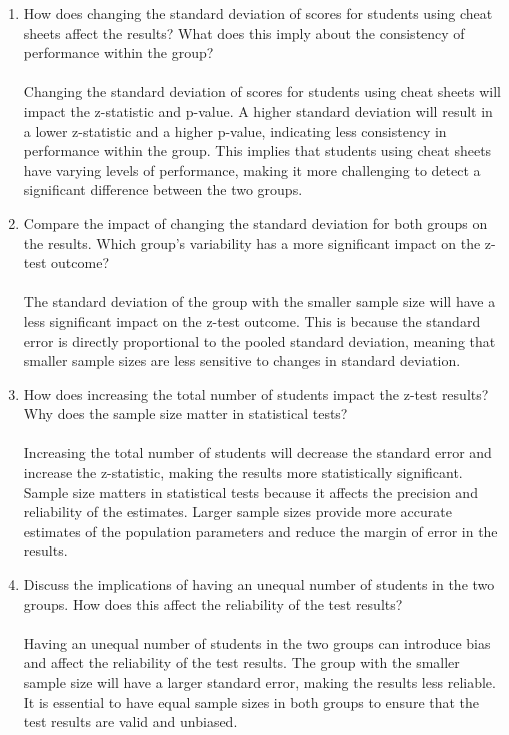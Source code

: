 \documentclass[a3paper,12pt]{extarticle} %
\begin{document}
\begin{enumerate}
\begin{enumerate}
        \item How does changing the standard deviation of scores for students using cheat sheets affect the
        results? What does this imply about the consistency of performance within the group?
        \\\\ Changing the standard deviation of scores for students using cheat sheets will impact the z-statistic and p-value. A higher standard deviation will result in a lower z-statistic and a higher p-value, indicating less consistency in performance within the group. This implies that students using cheat sheets have varying levels of performance, making it more challenging to detect a significant difference between the two groups.
        \item Compare the impact of changing the standard deviation for both groups on the results. Which
        group’s variability has a more significant impact on the z-test outcome?
        \\\\ The standard deviation of the group with the smaller sample size will have a less significant impact on the z-test outcome. This is because the standard error is directly proportional to the pooled standard deviation, meaning that smaller sample sizes are less sensitive to changes in standard deviation.
        \item How does increasing the total number of students impact the z-test results? Why does the
        sample size matter in statistical tests?
        \\\\ Increasing the total number of students will decrease the standard error and increase the z-statistic, making the results more statistically significant. Sample size matters in statistical tests because it affects the precision and reliability of the estimates. Larger sample sizes provide more accurate estimates of the population parameters and reduce the margin of error in the results.
        \item Discuss the implications of having an unequal number of students in the two groups. How
        does this affect the reliability of the test results?
        \\\\ Having an unequal number of students in the two groups can introduce bias and affect the reliability of the test results. The group with the smaller sample size will have a larger standard error, making the results less reliable. It is essential to have equal sample sizes in both groups to ensure that the test results are valid and unbiased.
    \end{enumerate}
\end{enumerate}
\end{document}
